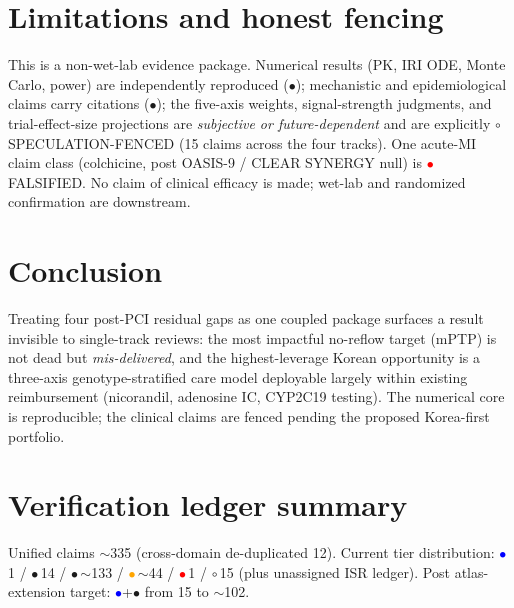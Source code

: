 \documentclass[11pt]{article}
\begin{document}
\section{Limitations and honest fencing}
\label{sec:limits}

This is a non-wet-lab evidence package. Numerical results (PK, IRI ODE, Monte Carlo, power) are independently reproduced (\textcolor{green!60!black}{$\bullet$}); mechanistic and epidemiological claims carry citations (\textcolor{yellow!70!black}{$\bullet$}); the five-axis weights, signal-strength judgments, and trial-effect-size projections are \emph{subjective or future-dependent} and are explicitly $\circ$\,SPECULATION-FENCED (15 claims across the four tracks). One acute-MI claim class (colchicine, post OASIS-9 / CLEAR SYNERGY null) is \textcolor{red}{$\bullet$}\,FALSIFIED. No claim of clinical efficacy is made; wet-lab and randomized confirmation are downstream.

\section{Conclusion}
\label{sec:conclusion}

Treating four post-PCI residual gaps as one coupled package surfaces a result invisible to single-track reviews: the most impactful no-reflow target (mPTP) is not dead but \emph{mis-delivered}, and the highest-leverage Korean opportunity is a three-axis genotype-stratified care model deployable largely within existing reimbursement (nicorandil, adenosine IC, CYP2C19 testing). The numerical core is reproducible; the clinical claims are fenced pending the proposed Korea-first portfolio.

\appendix
\section{Verification ledger summary}
\label{app:ledger}
Unified claims $\sim$335 (cross-domain de-duplicated 12). Current tier distribution: \textcolor{blue}{$\bullet$}\,1 / \textcolor{green!60!black}{$\bullet$}\,14 / \textcolor{yellow!70!black}{$\bullet$}\,$\sim$133 / \textcolor{orange}{$\bullet$}\,$\sim$44 / \textcolor{red}{$\bullet$}\,1 / $\circ$\,15 (plus unassigned ISR ledger). Post atlas-extension target: \textcolor{blue}{$\bullet$}+\textcolor{green!60!black}{$\bullet$} from 15 to $\sim$102.
\end{document}
